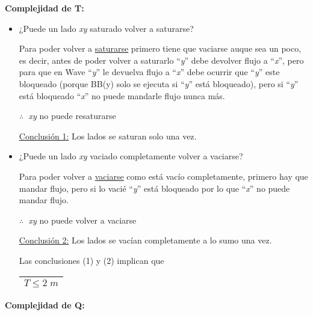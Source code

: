 \documentclass[12pt,a4paper]{report}
\begin{document}
		\vspace{5mm}
		\textbf{Complejidad de T:}
		\begin{itemize}
			\item ¿Puede un lado \textit{xy} saturado volver a saturarse?
			
			Para poder volver a \underline{saturarse} primero tiene que vaciarse auque sea un poco, es decir, antes de poder volver a saturarlo \textquotedblleft \textit{y}\textquotedblright \; debe devolver flujo a \textquotedblleft \textit{x}\textquotedblright \;, pero para que en Wave \textquotedblleft \textit{y}\textquotedblright \; le devuelva flujo a \textquotedblleft \textit{x}\textquotedblright \;  debe ocurrir que \textquotedblleft \textit{y}\textquotedblright \; este bloqueado (porque BB(y) solo se ejecuta si \textquotedblleft \textit{y}\textquotedblright \; está bloqueado), pero si \textquotedblleft \textit{y}\textquotedblright \; está bloqueado \textquotedblleft \textit{x}\textquotedblright \; no puede mandarle flujo nunca más.
			
			\begin{center}
				$ \therefore \;$ \textit{xy} no puede resaturarse
			\end{center}
			
			\underline{Conclusión 1:} Los lados se saturan solo una vez.
			
			\item ¿Puede un lado \textit{xy} vaciado completamente volver a vaciarse?
			
			Para poder volver a \underline{vaciarse} como está vacío completamente, primero hay que mandar flujo, pero si lo vacié \textquotedblleft \textit{y}\textquotedblright \; está bloqueado por lo que \textquotedblleft \textit{x}\textquotedblright \; no puede mandar flujo.
			
			\begin{center}
				$ \therefore \;$ \textit{xy} no puede volver a vaciarse
			\end{center}
			
			\underline{Conclusión 2:} Los lados se vacían completamente a lo sumo una vez.
			
			Las conclusiones (1) y (2) implican que \begin{tabular}{|c|} \hline $T \leq 2 \; m$ \\ \hline \end{tabular}
		\end{itemize}
	
		\textbf{Complejidad de Q:}
	
\end{document}
